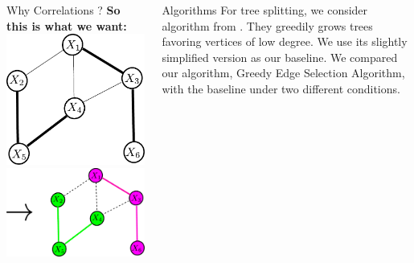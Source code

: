 \documentclass[serif,mathserif,final]{beamer}
\newcommand{\itemlinespace}{0.3in}
\newcommand{\insertlinespace}{\vspace{\itemlinespace}}
\begin{document}
\begin{frame}{}
\begin{columns}[t]
\begin{column}{0.49\linewidth}
\begin{block}{\Huge Why Correlations ?}
{        \textbf{So this is what we want:}  \\
        \insertlinespace
        \hspace{2in} 
        \includegraphics[width=4in]{figs/weighted} \hspace{0.4in}
        \includegraphics[width=6in]{figs/weighted_partition2}
      }
      \end{block}

    \end{column}%

    \begin{column}{0.49\linewidth}
      \begin{block}{Algorithms}
		For tree splitting, we consider algorithm from \cite{}. They
		greedily grows trees favoring vertices of low degree. We use
		its slightly simplified version as our baseline. We compared
		our algorithm, Greedy Edge Selection Algorithm, with the
		baseline under two different conditions.
		\begin{columns}[t]
			\begin{column}{0.49\linewidth}


\end{column}
\end{columns}
\end{block}
\end{column}
\end{columns}
\end{frame}
\end{document}

